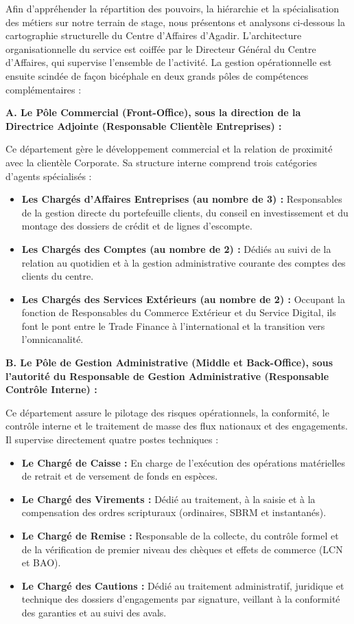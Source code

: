 \documentclass[12pt,a4paper]{report}
\begin{document}
Afin d'appréhender la répartition des pouvoirs, la hiérarchie et la spécialisation des métiers sur notre terrain de stage, nous présentons et analysons ci-dessous la cartographie structurelle du Centre d'Affaires d'Agadir. L'architecture organisationnelle du service est coiffée par le Directeur Général du Centre d'Affaires, qui supervise l'ensemble de l'activité. La gestion opérationnelle est ensuite scindée de façon bicéphale en deux grands pôles de compétences complémentaires :

\textbf{A. Le Pôle Commercial (Front-Office), sous la direction de la Directrice Adjointe (Responsable Clientèle Entreprises) :}

Ce département gère le développement commercial et la relation de proximité avec la clientèle Corporate. Sa structure interne comprend trois catégories d'agents spécialisés :

\begin{itemize}
  \item \textbf{Les Chargés d'Affaires Entreprises (au nombre de 3) :} Responsables de la gestion directe du portefeuille clients, du conseil en investissement et du montage des dossiers de crédit et de lignes d'escompte.
  \item \textbf{Les Chargés des Comptes (au nombre de 2) :} Dédiés au suivi de la relation au quotidien et à la gestion administrative courante des comptes des clients du centre.
  \item \textbf{Les Chargés des Services Extérieurs (au nombre de 2) :} Occupant la fonction de Responsables du Commerce Extérieur et du Service Digital, ils font le pont entre le Trade Finance à l'international et la transition vers l'omnicanalité.
\end{itemize}

\textbf{B. Le Pôle de Gestion Administrative (Middle et Back-Office), sous l'autorité du Responsable de Gestion Administrative (Responsable Contrôle Interne) :}

Ce département assure le pilotage des risques opérationnels, la conformité, le contrôle interne et le traitement de masse des flux nationaux et des engagements. Il supervise directement quatre postes techniques :

\begin{itemize}
  \item \textbf{Le Chargé de Caisse :} En charge de l'exécution des opérations matérielles de retrait et de versement de fonds en espèces.
  \item \textbf{Le Chargé des Virements :} Dédié au traitement, à la saisie et à la compensation des ordres scripturaux (ordinaires, SBRM et instantanés).
  \item \textbf{Le Chargé de Remise :} Responsable de la collecte, du contrôle formel et de la vérification de premier niveau des chèques et effets de commerce (LCN et BAO).
  \item \textbf{Le Chargé des Cautions :} Dédié au traitement administratif, juridique et technique des dossiers d'engagements par signature, veillant à la conformité des garanties et au suivi des avals.
\end{itemize}
\end{document}
